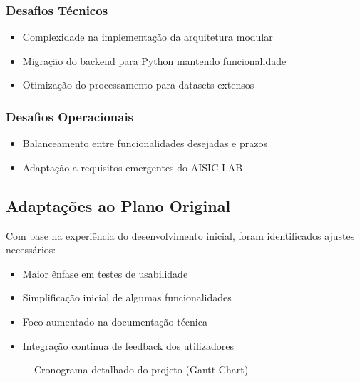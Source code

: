 \subsubsection{Desafios Técnicos}
\begin{itemize}
    \item Complexidade na implementação da arquitetura modular
    \item Migração do backend para Python mantendo funcionalidade
    \item Otimização do processamento para datasets extensos
\end{itemize}

\subsubsection{Desafios Operacionais}
\begin{itemize}
    \item Balanceamento entre funcionalidades desejadas e prazos
    \item Adaptação a requisitos emergentes do AISIC LAB
\end{itemize}

\subsection{Adaptações ao Plano Original}

Com base na experiência do desenvolvimento inicial, foram identificados ajustes necessários:

\begin{itemize}
    \item Maior ênfase em testes de usabilidade
    \item Simplificação inicial de algumas funcionalidades
    \item Foco aumentado na documentação técnica
    \item Integração contínua de feedback dos utilizadores
\end{itemize}

\begin{landscape}
    \begin{figure}[p]
        \centering
        \caption{Cronograma detalhado do projeto (Gantt Chart)}
        \label{fig:gantt-chart}
    \end{figure}
\end{landscape}
